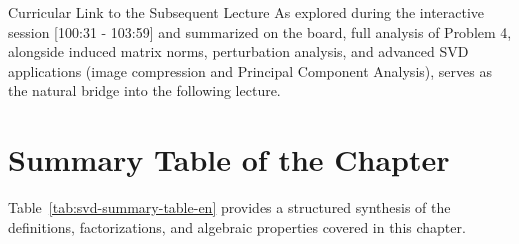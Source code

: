 \begin{noteblock}{Curricular Link to the Subsequent Lecture}
As explored during the interactive session [100:31 - 103:59] and summarized on the board, full analysis of Problem 4, alongside induced matrix norms, perturbation analysis, and advanced SVD applications (image compression and Principal Component Analysis), serves as the natural bridge into the following lecture.
\end{noteblock}

\clearpage
\section{Summary Table of the Chapter}
\label{sec:svd-summary-table-en}

Table~\ref{tab:svd-summary-table-en} provides a structured synthesis of the definitions, factorizations, and algebraic properties covered in this chapter.

